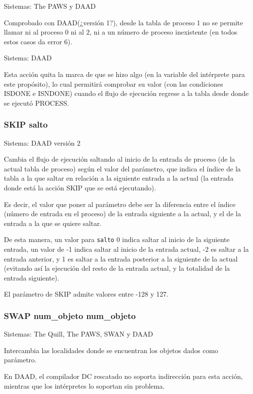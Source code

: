 \documentclass[11pt, a5paper]{article}
\newcommand{\quill}{\textsf{The Quill}\xspace}
\newcommand{\paw}{\textsf{The PAWS}\xspace}
\newcommand{\swan}{\textsf{SWAN}\xspace}
\newcommand{\daad}{\textsf{DAAD}\xspace}
\newcommand{\sistema}[1]{\noindent Sistema: #1 \nopagebreak}
\newcommand{\sistemas}[1]{\noindent Sistemas: #1 \nopagebreak}
\begin{document}
\sistemas{\paw y \daad}

Comprobado con \daad (¿versión 1?), desde la tabla de proceso 1 no se permite llamar ni al proceso 0 ni al 2, ni a un número de proceso inexistente (en todos estos casos da error 6).

\sistema{\daad}

Esta acción quita la marca de que se hizo algo (en la variable del intérprete para este propósito), lo cual permitirá comprobar su valor (con las condiciones ISDONE e ISNDONE) cuando el flujo de ejecución regrese a la tabla desde donde se ejecutó PROCESS.

\subsubsection{SKIP salto}

\sistema{\daad versión 2}

Cambia el flujo de ejecución saltando al inicio de la entrada de proceso (de la actual tabla de proceso) según el valor del parámetro, que indica el índice de la tabla a la que saltar en relación a la siguiente entrada a la actual (la entrada donde está la acción SKIP que se está ejecutando).

Es decir, el valor que poner al parámetro debe ser la diferencia entre el índice (número de entrada en el proceso) de la entrada siguiente a la actual, y el de la entrada a la que se quiere saltar.

De esta manera, un valor para \texttt{salto} 0 indica saltar al inicio de la siguiente entrada, un valor de -1 indica saltar al inicio de la entrada actual, -2 es saltar a la entrada anterior, y 1 es saltar a la entrada posterior a la siguiente de la actual (evitando así la ejecución del resto de la entrada actual, y la totalidad de la entrada siguiente).

El parámetro de SKIP admite valores entre -128 y 127.

\subsubsection{SWAP num\_objeto num\_objeto}

\sistemas{\quill, \paw, \swan y \daad}

Intercambia las localidades donde se encuentran los objetos dados como parámetro.

En \daad, el compilador DC rescatado no soporta indirección para esta acción, mientras que los intérpretes lo soportan sin problema.
\end{document}
